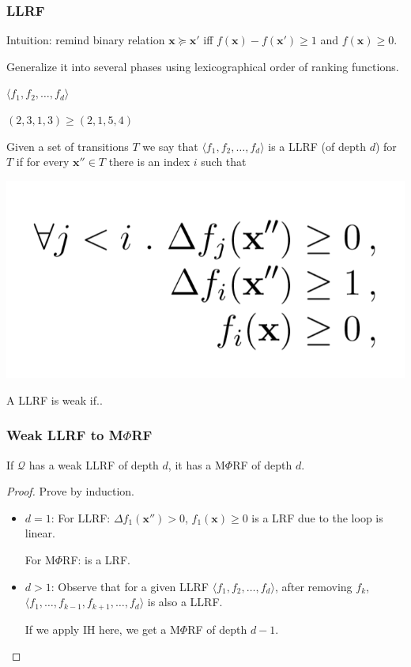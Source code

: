 \documentclass[11pt]{beamer}
\begin{document}
\begin{frame}\frametitle{LLRF}

Intuition: remind binary relation $\textbf{x} \succeq \textbf{x}'$ iff  $f(\textbf{x}) - f(\textbf{x}') \ge 1$ and $f(\textbf{x}) \ge 0$.

Generalize it into several phases using lexicographical order of ranking functions.

$\langle f_1, f_2, \ldots, f_d\rangle$

$(2,3,1,3) \ge (2,1,5,4)$

\begin{definition}[LLRF]
Given a set of transitions $T$ we say that 
$\langle f_1, f_2, \ldots, f_d\rangle$ is a LLRF (of depth $d$) for $T$ if for every $\textbf{x}''\in T$ there is an index $i$ such that 
\begin{center}
\includegraphics[scale = 0.26]{4.PNG}

\end{center}
A LLRF is weak if..
\end{definition}

\end{frame}

\begin{frame}\frametitle{Weak LLRF to M$\Phi$RF}

\begin{theorem}[3]
If $\mathcal{Q}$ has a weak LLRF of depth $d$, it has a  M$\Phi$RF of depth $d$.


\end{theorem}

\begin{proof}
Prove by induction.

\begin{itemize}

\item $d = 1$: 
For LLRF: $\Delta f_1(\textbf{x}'') > 0$, $f_1(\textbf{x}) \ge 0$ is a LRF due to the loop is linear.

For M$\Phi$RF: is a LRF.

\item $d > 1$: Observe that for a given LLRF $\langle f_1, f_2, \ldots, f_d\rangle $, after removing $f_k$, $\langle f_1, \ldots, f_{k-1}, f_{k+1}, \ldots, f_d\rangle$ is also a LLRF.

If we apply IH here, we get a M$\Phi$RF of depth $d-1$.

\end{itemize}


\end{proof}


\end{frame}
\end{document}
